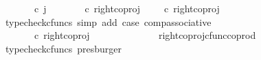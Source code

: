 \begin{isabellebody}
\ {\isachardoublequoteopen}{\isacharparenleft}{\kern0pt}{\isasymlangle}{\isasymf}{\isacharcomma}{\kern0pt}\ {\isasymf}{\isasymrangle}{\isasymamalg}\ {\isacharparenleft}{\kern0pt}{\isasymlangle}{\isasymt}{\isacharcomma}{\kern0pt}\ {\isasymf}{\isasymrangle}\ {\isasymamalg}{\isasymlangle}{\isasymf}{\isacharcomma}{\kern0pt}\ {\isasymt}{\isasymrangle}{\isacharparenright}{\kern0pt}{\isacharparenright}{\kern0pt}\ {\isasymcirc}\isactrlsub c\ j\ {\isacharequal}{\kern0pt}\ {\isacharparenleft}{\kern0pt}{\isacharparenleft}{\kern0pt}{\isasymlangle}{\isasymf}{\isacharcomma}{\kern0pt}\ {\isasymf}{\isasymrangle}{\isasymamalg}\ {\isacharparenleft}{\kern0pt}{\isasymlangle}{\isasymt}{\isacharcomma}{\kern0pt}\ {\isasymf}{\isasymrangle}\ {\isasymamalg}{\isasymlangle}{\isasymf}{\isacharcomma}{\kern0pt}\ {\isasymt}{\isasymrangle}{\isacharparenright}{\kern0pt}{\isacharparenright}{\kern0pt}\ {\isasymcirc}\isactrlsub c\ right{\isacharunderscore}{\kern0pt}coproj\ {\isasymone}\ {\isacharparenleft}{\kern0pt}{\isasymone}\ {\isasymCoprod}\ {\isasymone}{\isacharparenright}{\kern0pt}{\isacharparenright}{\kern0pt}\ {\isasymcirc}\isactrlsub c\ right{\isacharunderscore}{\kern0pt}coproj\ {\isasymone}\ {\isasymone}{\isachardoublequoteclose}\isanewline
\ \ \ \ \ \ \ \ \ \ \isamarkupfalse%
\ {\isacharparenleft}{\kern0pt}typecheck{\isacharunderscore}{\kern0pt}cfuncs{\isacharcomma}{\kern0pt}\ simp\ add{\isacharcolon}{\kern0pt}\ case{}\ comp{\isacharunderscore}{\kern0pt}associative{}{\isacharparenright}{\kern0pt}\isanewline
\ \ \ \ \ \ \ \ \isamarkupfalse%
\ \isamarkupfalse%
\ {\isachardoublequoteopen}{\isachardot}{\kern0pt}{\isachardot}{\kern0pt}{\isachardot}{\kern0pt}\ {\isacharequal}{\kern0pt}\ {\isacharparenleft}{\kern0pt}{\isasymlangle}{\isasymt}{\isacharcomma}{\kern0pt}\ {\isasymf}{\isasymrangle}\ {\isasymamalg}{\isasymlangle}{\isasymf}{\isacharcomma}{\kern0pt}\ {\isasymt}{\isasymrangle}{\isacharparenright}{\kern0pt}\ {\isasymcirc}\isactrlsub c\ right{\isacharunderscore}{\kern0pt}coproj\ {\isasymone}\ {\isasymone}{\isachardoublequoteclose}\isanewline
\ \ \ \ \ \ \ \ \ \ \isamarkupfalse%
\ right{\isacharunderscore}{\kern0pt}coproj{\isacharunderscore}{\kern0pt}cfunc{\isacharunderscore}{\kern0pt}coprod\ \isamarkupfalse%
\ {\isacharparenleft}{\kern0pt}typecheck{\isacharunderscore}{\kern0pt}cfuncs{\isacharcomma}{\kern0pt}\ presburger{\isacharparenright}{\kern0pt}\isanewline
\ \ \ \ \ \ \ \ \isamarkupfalse%
\ \isamarkupfalse%
\ {\isachardoublequoteopen}{\isachardot}{\kern0pt}{\isachardot}{\kern0pt}{\isachardot}{\kern0pt}\ {\isacharequal}{\kern0pt}\ {\isasymlangle}{\isasymf}{\isacharcomma}{\kern0pt}\ {\isasymt}{\isasymrangle}{\isachardoublequoteclose}\isanewline

\end{isabellebody}
